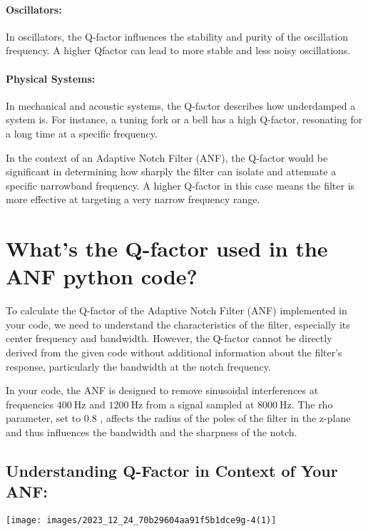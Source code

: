 \paragraph{Oscillators:}

In oscillators, the Q-factor influences the stability and purity of the oscillation frequency. A higher Qfactor can lead to more stable and less noisy oscillations.

\paragraph{Physical Systems:}

In mechanical and acoustic systems, the Q-factor describes how underdamped a system is. For instance, a tuning fork or a bell has a high Q-factor, resonating for a long time at a specific frequency.

In the context of an Adaptive Notch Filter (ANF), the Q-factor would be significant in determining how sharply the filter can isolate and attenuate a specific narrowband frequency. A higher Q-factor in this case means the filter is more effective at targeting a very narrow frequency range.

\section{What's the Q-factor used in the ANF python code?}
To calculate the Q-factor of the Adaptive Notch Filter (ANF) implemented in your code, we need to understand the characteristics of the filter, especially its center frequency and bandwidth. However, the Q-factor cannot be directly derived from the given code without additional information about the filter's response, particularly the bandwidth at the notch frequency.

In your code, the ANF is designed to remove sinusoidal interferences at frequencies $400 \mathrm{~Hz}$ and $1200 \mathrm{~Hz}$ from a signal sampled at $8000 \mathrm{~Hz}$. The rho parameter, set to 0.8 , affects the radius of the poles of the filter in the z-plane and thus influences the bandwidth and the sharpness of the notch.

\subsection{Understanding Q-Factor in Context of Your ANF:}

\begin{center}
\texttt{[image: images/2023\_12\_24\_70b29604aa91f5b1dce9g-4(1)]}
\end{center}

